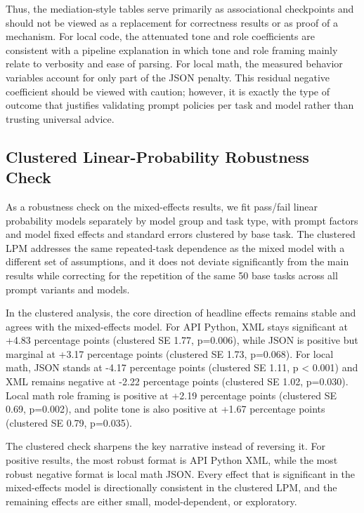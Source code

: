 \documentclass{llncs}
\begin{document}
Thus, the mediation-style tables serve primarily as associational checkpoints and should not be viewed as a replacement for correctness results or as proof of a mechanism. For local code, the attenuated tone and role coefficients are consistent with a pipeline explanation in which tone and role framing mainly relate to verbosity and ease of parsing. For local math, the measured behavior variables account for only part of the JSON penalty. This residual negative coefficient should be viewed with caution; however, it is exactly the type of outcome that justifies validating prompt policies per task and model rather than trusting universal advice.

\subsection{Clustered Linear-Probability Robustness Check}\label{clustered-linear-probability-robustness-check}

As a robustness check on the mixed-effects results, we fit pass/fail linear probability models separately by model group and task type, with prompt factors and model fixed effects and standard errors clustered by base task. The clustered LPM addresses the same repeated-task dependence as the mixed model with a different set of assumptions, and it does not deviate significantly from the main results while correcting for the repetition of the same 50 base tasks across all prompt variants and models.

In the clustered analysis, the core direction of headline effects remains stable and agrees with the mixed-effects model. For API Python, XML stays significant at +4.83 percentage points (clustered SE 1.77, p=0.006), while JSON is positive but marginal at +3.17 percentage points (clustered SE 1.73, p=0.068). For local math, JSON stands at -4.17 percentage points (clustered SE 1.11, p \textless{} 0.001) and XML remains negative at -2.22 percentage points (clustered SE 1.02, p=0.030). Local math role framing is positive at +2.19 percentage points (clustered SE 0.69, p=0.002), and polite tone is also positive at +1.67 percentage points (clustered SE 0.79, p=0.035).

The clustered check sharpens the key narrative instead of reversing it. For positive results, the most robust format is API Python XML, while the most robust negative format is local math JSON. Every effect that is significant in the mixed-effects model is directionally consistent in the clustered LPM, and the remaining effects are either small, model-dependent, or exploratory.
\end{document}
